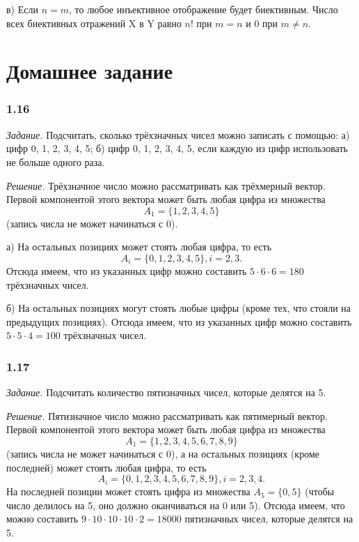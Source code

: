 \documentclass{book}
\begin{document}
в) Если $n=m$, то любое инъективное отображение будет биективным. Число всех биективных отражений X в Y равно $n!$ при $m=n$ и 0 при $m\neq n$.

\section*{Домашнее задание}

\subsubsection*{1.16}

\textit{Задание.} Подсчитать, сколько трёхзначных чисел можно записать с помощью: а) цифр 0, 1, 2, 3, 4, 5; б) цифр 0, 1, 2, 3, 4, 5, если каждую из цифр использовать не больше одного раза.

\textit{Решение.} Трёхзначное число можно рассматривать как трёхмерный вектор. Первой компонентой этого вектора может быть любая цифра из множества $$A_1=\{1, 2, 3, 4, 5\}$$ (запись числа не может начинаться с 0).

а) На остальных позициях может стоять любая цифра, то есть $$A_i=\{0, 1, 2, 3, 4, 5\}, i=2, 3.$$ Отсюда имеем, что из указанных цифр можно составить $5\cdot 6\cdot 6=180$ трёхзначных чисел.

б) На остальных позициях могут стоять любые цифры (кроме тех, что стояли на предыдущих позициях). Отсюда имеем, что из указанных цифр можно составить $5\cdot 5\cdot 4=100$ трёхзначных чисел.

\subsubsection*{1.17}

\textit{Задание.} Подсчитать количество пятизначных чисел, которые делятся на 5.

\textit{Решение.} Пятизначное число можно рассматривать как пятимерный вектор. Первой компонентой этого вектора может быть любая цифра из множества $$A_1=\{1, 2, 3, 4, 5, 6, 7, 8, 9\}$$ (запись числа не может начинаться с 0), а на остальных позициях (кроме последней) может стоять любая цифра, то есть $$A_i=\{0, 1, 2, 3, 4, 5, 6, 7, 8, 9\}, i=2, 3, 4.$$ На последней позиции может стоять цифра из множества $A_5=\{0, 5\}$ (чтобы число делилось на 5, оно должно оканчиваться на 0 или 5). Отсюда имеем, что можно составить $9\cdot 10\cdot 10\cdot 10\cdot 2=18000$ пятизначных чисел, которые делятся на 5.
\end{document}
